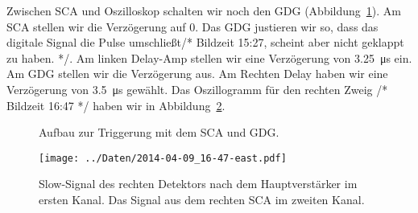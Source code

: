 Zwischen SCA und Oszilloskop schalten wir noch den GDG
(Abbildung~\ref{fig:aufbau:sca_gdg}). Am SCA stellen wir die Verzögerung auf 0.
Das GDG justieren wir so, dass das digitale Signal die Pulse umschließt/*
Bildzeit 15:27, scheint aber nicht geklappt zu haben. */. Am linken Delay-Amp
stellen wir eine Verzögerung von \SI{3.25}{\micro\second} ein. Am GDG stellen
wir die Verzögerung aus. Am Rechten Delay haben wir eine Verzögerung von
\SI{3.5}{\micro\second} gewählt. Das Oszillogramm für den rechten Zweig
/* Bildzeit 16:47 */ haben wir in Abbildung~\ref{fig:sca_umschlossen}.

\begin{figure}[htbp]
    \centering
    \caption{%
        Aufbau zur Triggerung mit dem SCA und GDG.
    }
    \label{fig:aufbau:sca_gdg}
\end{figure}

\begin{figure}[htbp]
    \centering
    \texttt{[image: ../Daten/2014-04-09\_16-47-east.pdf]}
    \caption{%
        Slow-Signal des rechten Detektors nach dem Hauptverstärker im ersten
        Kanal. Das Signal aus dem rechten SCA im zweiten Kanal.
    }
    \label{fig:sca_umschlossen}
\end{figure}


